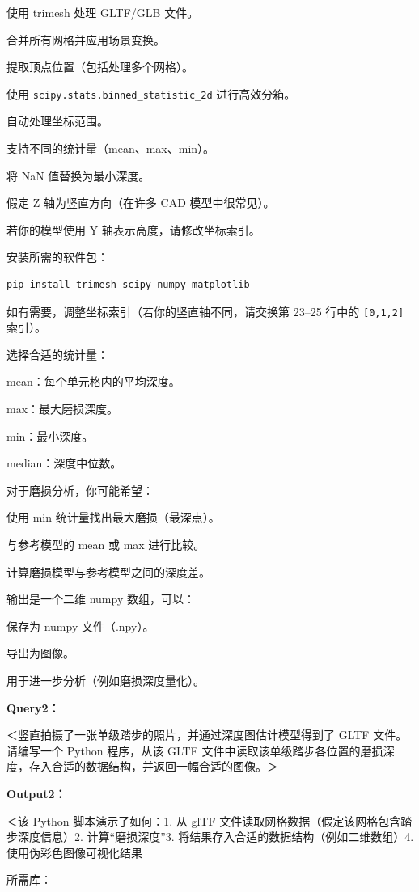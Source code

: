 \documentclass[11pt,a4paper]{ctexart}
\begin{document}
使用 trimesh 处理 GLTF/GLB 文件。

合并所有网格并应用场景变换。

提取顶点位置（包括处理多个网格）。

使用 \texttt{scipy.stats.binned\_statistic\_2d} 进行高效分箱。

自动处理坐标范围。

支持不同的统计量（mean、max、min）。

将 NaN 值替换为最小深度。

假定 Z 轴为竖直方向（在许多 CAD 模型中很常见）。

若你的模型使用 Y 轴表示高度，请修改坐标索引。

安装所需的软件包：

\begin{lstlisting}
pip install trimesh scipy numpy matplotlib
\end{lstlisting}

如有需要，调整坐标索引（若你的竖直轴不同，请交换第 23--25 行中的 \texttt{[0,1,2]} 索引）。

选择合适的统计量：

mean：每个单元格内的平均深度。

max：最大磨损深度。

min：最小深度。

median：深度中位数。

对于磨损分析，你可能希望：

使用 min 统计量找出最大磨损（最深点）。

与参考模型的 mean 或 max 进行比较。

计算磨损模型与参考模型之间的深度差。

输出是一个二维 numpy 数组，可以：

保存为 numpy 文件（.npy）。

导出为图像。

用于进一步分析（例如磨损深度量化）。

\noindent\textbf{Query2：}

＜竖直拍摄了一张单级踏步的照片，并通过深度图估计模型得到了 GLTF 文件。请编写一个 Python 程序，从该 GLTF 文件中读取该单级踏步各位置的磨损深度，存入合适的数据结构，并返回一幅合适的图像。＞

\noindent\textbf{Output2：}

＜该 Python 脚本演示了如何：1. 从 glTF 文件读取网格数据（假定该网格包含踏步深度信息）2. 计算“磨损深度”3. 将结果存入合适的数据结构（例如二维数组）4. 使用伪彩色图像可视化结果

所需库：
\end{document}
